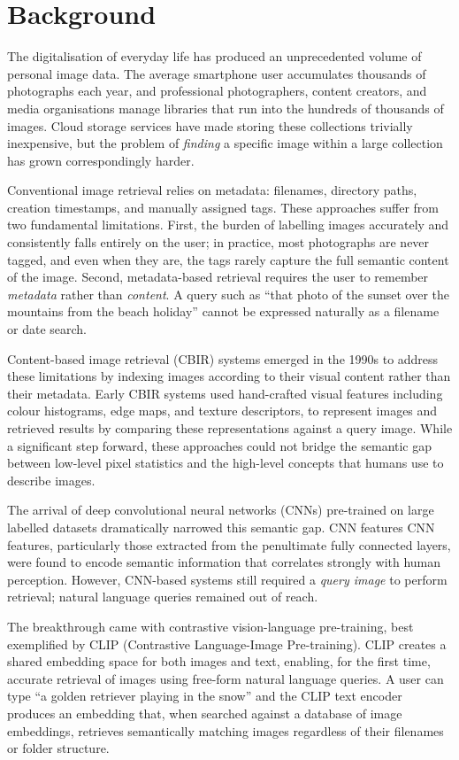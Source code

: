 \documentclass[12pt,a4paper,oneside]{report}
\begin{document}
\section{Background}
The digitalisation of everyday life has produced an unprecedented volume of
personal image data.  The average smartphone user accumulates thousands of
photographs each year, and professional photographers, content creators, and
media organisations manage libraries that run into the hundreds of thousands
of images.  Cloud storage services have made storing these collections
trivially inexpensive, but the problem of \textit{finding} a specific image
within a large collection has grown correspondingly harder.

Conventional image retrieval relies on metadata: filenames, directory paths,
creation timestamps, and manually assigned tags. These approaches suffer from
two fundamental limitations. First, the burden of labelling images accurately
and consistently falls entirely on the user; in practice, most photographs are
never tagged, and even when they are, the tags rarely capture the full semantic
content of the image.  Second, metadata-based retrieval requires the user to
remember \textit{metadata} rather than \textit{content}. A query such as
``that photo of the sunset over the mountains from the beach holiday'' cannot
be expressed naturally as a filename or date search.

Content-based image retrieval (CBIR) systems emerged in the 1990s to address
these limitations by indexing images according to their visual content rather
than their metadata. Early CBIR systems used hand-crafted visual features
including colour histograms, edge maps, and texture descriptors, to represent
images and retrieved results by comparing these representations against a
query image. While a significant step forward, these approaches could not
bridge the semantic gap between low-level pixel statistics and the high-level
concepts that humans use to describe images.

The arrival of deep convolutional neural networks (CNNs) pre-trained on large
labelled datasets dramatically narrowed this semantic gap. CNN features
CNN features, particularly those extracted from the penultimate fully connected layers,
were found to encode semantic information that correlates strongly with
human perception. However, CNN-based systems still required a \textit{query
image} to perform retrieval; natural language queries remained out of reach.

The breakthrough came with contrastive vision-language pre-training, best
exemplified by CLIP (Contrastive Language-Image Pre-training). CLIP creates
a shared embedding space for both images and text, enabling, for the first
time, accurate retrieval of images using free-form natural language queries.
A user can type ``a golden retriever playing in the snow'' and the CLIP text
encoder produces an embedding that, when searched against a database of image
embeddings, retrieves semantically matching images regardless of their
filenames or folder structure.
\end{document}
